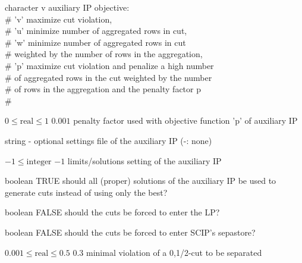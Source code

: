 %
{character}%
{v}%
{auxiliary IP objective:\\   \#                      'v' maximize cut violation,\\   \#                      'u' minimize number of aggregated rows in cut,\\   \#                      'w' minimize number of aggregated rows in cut\\   \#                          weighted by the number of rows in the aggregation,\\   \#                      'p' maximize cut violation and penalize a high number\\   \#                          of aggregated rows in the cut weighted by the number\\   \#                          of rows in the aggregation and the penalty factor p\\   \#}%
{}

%
{$0\leq\textrm{real}\leq1$}%
{$0.001$}%
{penalty factor used with objective function 'p' of auxiliary IP}%
{}

%
{string}%
{-}%
{optional settings file of the auxiliary IP (-: none)}%
{}

%
{$-1\leq\textrm{integer}$}%
{$-1$}%
{limits/solutions setting of the auxiliary IP}%
{}

%
{boolean}%
{TRUE}%
{should all (proper) solutions of the auxiliary IP be used to generate cuts instead of using only the best?}%
{}

%
{boolean}%
{FALSE}%
{should the cuts be forced to enter the LP?}%
{}

%
{boolean}%
{FALSE}%
{should the cuts be forced to enter SCIP's sepastore?}%
{}

%
{$0.001\leq\textrm{real}\leq0.5$}%
{$0.3$}%
{minimal violation of a {0,1/2}-cut to be separated}%
{}

